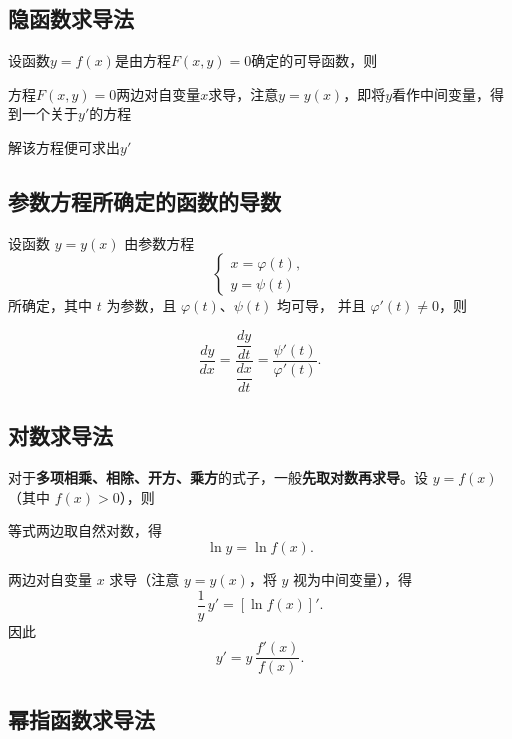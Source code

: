 \documentclass[a4paper,12pt]{article}
\begin{document}
    \subsection{隐函数求导法}

    设函数$y = f(x)$是由方程$F(x, y) = 0$确定的可导函数，则
    \begin{circlenum}
        \item 方程$F(x, y) = 0$两边对自变量$x$求导，注意$y = y(x)$，即将$y$看作中间变量，得到一个关于$y'$的方程
        \item 解该方程便可求出$y'$
    \end{circlenum}

    \subsection{参数方程所确定的函数的导数}

    设函数 $y=y(x)$ 由参数方程
    \[
        \begin{cases}
            x=\varphi(t),\\
            y=\psi(t)
        \end{cases}
    \]
    所确定，其中 $t$ 为参数，且 $\varphi(t)$、$\psi(t)$ 均可导，
    并且 $\varphi'(t)\neq 0$，则

    \[
        \frac{dy}{dx}
        =
        \frac{\dfrac{dy}{dt}}{\dfrac{dx}{dt}}
        =
        \frac{\psi'(t)}{\varphi'(t)}.
    \]

    \subsection{对数求导法}

    对于\textbf{多项相乘、相除、开方、乘方}的式子，一般\textbf{先取对数再求导}。设 $y=f(x)$（其中 $f(x)>0$），则
    \begin{circlenum}
        \item 等式两边取自然对数，得
        \[
            \ln y = \ln f(x).
        \]

        \item 两边对自变量 $x$ 求导（注意 $y=y(x)$，将 $y$ 视为中间变量），得
        \[
            \frac{1}{y}\,y' = [\ln f(x)]'.
        \]
        因此
        \[
            y' = y\,\frac{f'(x)}{f(x)}.
        \]
    \end{circlenum}

    \subsection{幂指函数求导法}
\end{document}
